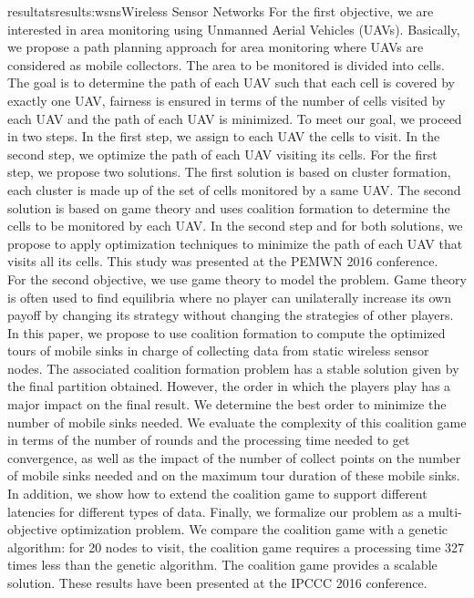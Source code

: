 \documentclass{ra2016}
\begin{document}
\begin{module}{resultats}{results:wsns}{Wireless Sensor Networks}
For the first objective, we are interested in area monitoring using Unmanned Aerial Vehicles (UAVs). Basically, we propose a path planning approach for area monitoring where UAVs are considered as mobile collectors. The area to be monitored is divided into cells. The goal is to determine the path of each UAV such that each cell is covered by exactly one UAV, fairness is ensured in terms of the number of cells visited by each UAV and the path of each UAV is minimized. To meet our goal, we proceed in two steps. In the first step, we assign to each UAV the cells to visit. In the second step, we optimize the path of each UAV visiting its cells. For the first step, we propose two solutions. The first solution is based on cluster formation, each cluster is made up of the set of cells monitored by a same UAV. The second solution is based on game theory and uses coalition formation to determine the cells to be monitored by each UAV. In the second step and for both solutions, we propose to apply optimization techniques to minimize the path of each UAV that visits all its cells. This study was presented at the PEMWN 2016 conference.\\

For the second objective, we use game theory to model the problem. Game theory is often used to find equilibria where no player can unilaterally increase its own payoff by changing its strategy without changing the strategies of other players. In this paper, we propose to use coalition formation to compute the optimized tours of mobile sinks in charge of collecting data from static wireless sensor nodes. The associated coalition formation problem has a stable solution given by the final partition obtained. However, the order in which the players play has a major impact on the final result. We determine the best order to minimize the number of mobile sinks needed.  We evaluate the complexity of this coalition game in terms of the number of rounds and the processing time needed to get convergence, as well as the impact of the number of collect points on the number of mobile sinks needed and on the maximum tour duration of these mobile sinks. In addition, we show how to extend the coalition game to support different latencies for different types of data. Finally, we formalize our problem as a multi-objective optimization problem. We compare the coalition game with a genetic algorithm: for 20 nodes to visit, the coalition game requires a processing time 327 times less than the genetic algorithm. The coalition game provides a scalable solution. These results have been presented at the IPCCC 2016 conference.\\


\end{module}
\end{document}
